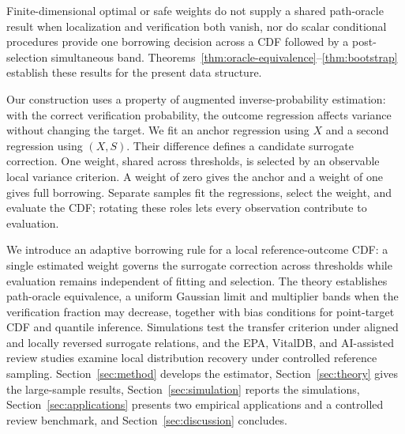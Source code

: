 Finite-dimensional optimal or safe weights do not supply a shared path-oracle
result when localization and verification both vanish, nor do scalar
conditional procedures provide one borrowing decision across a CDF followed by
a post-selection simultaneous band.
Theorems~\ref{thm:oracle-equivalence}--\ref{thm:bootstrap} establish these
results for the present data structure.

Our construction uses a property of augmented inverse-probability estimation:
with the correct verification probability, the outcome regression affects
variance without changing the target. We fit an anchor regression using \(X\)
and a second regression using \((X,S)\). Their difference defines a candidate
surrogate correction. One weight, shared across thresholds, is selected by an
observable local variance criterion. A weight of zero gives the anchor and a
weight of one gives full borrowing. Separate samples fit the regressions,
select the weight, and evaluate the CDF; rotating these roles lets every
observation contribute to evaluation.

We introduce an adaptive borrowing rule for a local
reference-outcome CDF: a single estimated weight governs the surrogate
correction across thresholds while evaluation remains independent of fitting
and selection. The theory establishes path-oracle equivalence, a uniform
Gaussian limit and multiplier bands when the verification fraction may
decrease, together with bias conditions for point-target CDF and quantile
inference. Simulations test the transfer criterion under aligned and locally
reversed surrogate relations, and the EPA, VitalDB, and AI-assisted review
studies examine local distribution recovery under controlled reference
sampling. Section~\ref{sec:method} develops the estimator,
Section~\ref{sec:theory} gives the large-sample results,
Section~\ref{sec:simulation} reports the simulations,
Section~\ref{sec:applications} presents two empirical applications and a
controlled review benchmark, and
Section~\ref{sec:discussion} concludes.
